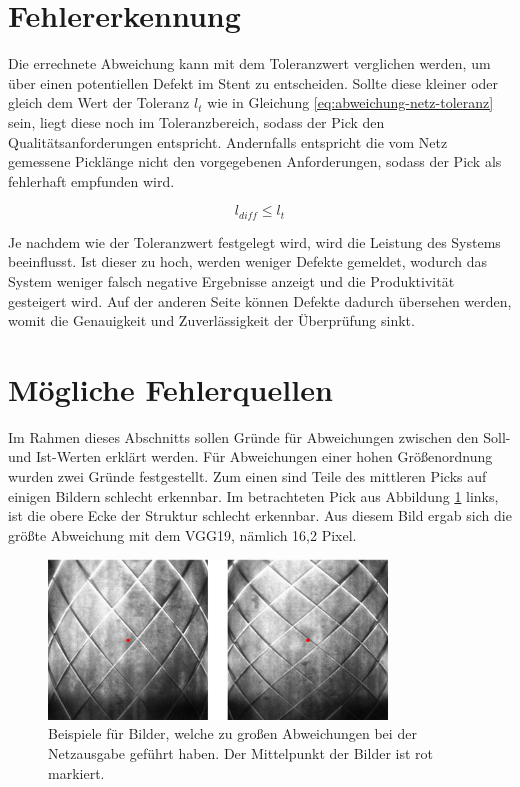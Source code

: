 \section{Fehlererkennung}
Die errechnete Abweichung kann mit dem Toleranzwert verglichen werden, um über einen potentiellen Defekt im Stent zu entscheiden. Sollte diese kleiner oder gleich dem Wert der Toleranz $l_t$ wie in Gleichung \ref{eq:abweichung-netz-toleranz} sein, liegt diese noch im Toleranzbereich, sodass der Pick den Qualitätsanforderungen entspricht. Andernfalls entspricht die vom Netz gemessene Picklänge nicht den vorgegebenen Anforderungen, sodass der Pick als fehlerhaft empfunden wird.

\begin{equation}\label{eq:abweichung-netz-toleranz}
l_{diff} \leq l_t
\end{equation}

\mypar Je nachdem wie der Toleranzwert festgelegt wird, wird die Leistung des Systems beeinflusst. Ist dieser zu hoch, werden weniger Defekte gemeldet, wodurch das System weniger falsch negative Ergebnisse anzeigt und die Produktivität gesteigert wird. Auf der anderen Seite können Defekte dadurch übersehen werden, womit die Genauigkeit und Zuverlässigkeit der Überprüfung sinkt. 


\section{Mögliche Fehlerquellen}\label{sec:fehlerquellen-sec}
Im Rahmen dieses Abschnitts sollen Gründe für Abweichungen zwischen den Soll- und Ist-Werten erklärt werden. Für Abweichungen einer hohen Größenordnung wurden zwei Gründe festgestellt. Zum einen sind Teile des mittleren Picks auf einigen Bildern schlecht erkennbar. Im betrachteten Pick aus Abbildung \ref{fig:bilder-abweichungen} links, ist die obere Ecke der Struktur schlecht erkennbar. Aus diesem Bild ergab sich die größte Abweichung mit dem VGG19, nämlich 16,2 Pixel.

\begin{figure}[h!]
\centering
\includegraphics[width=9cm]{98_images/grosse_abweichungen.png}
\caption{Beispiele für Bilder, welche zu großen Abweichungen bei der Netzausgabe geführt haben. Der Mittelpunkt der Bilder ist rot markiert.}
\label{fig:bilder-abweichungen}
\end{figure}

